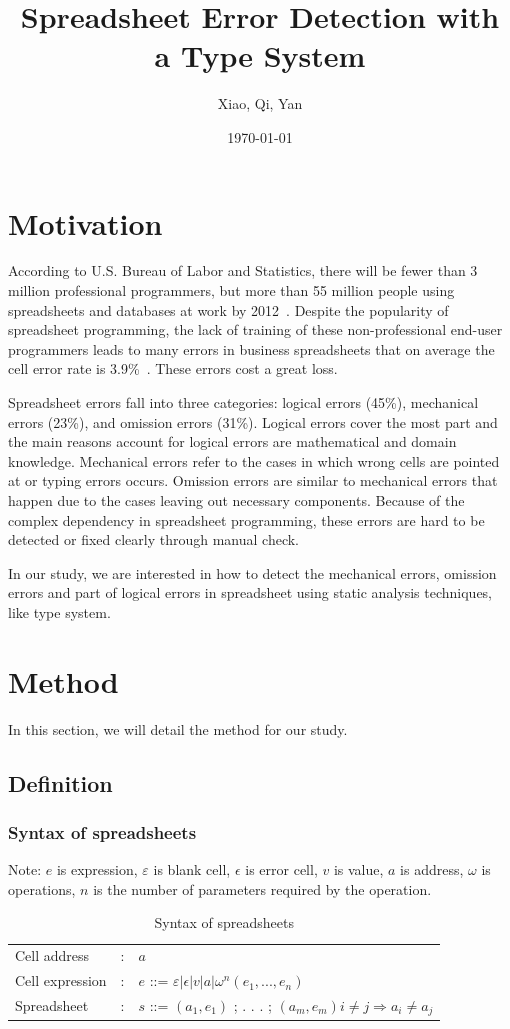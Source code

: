 \documentclass[a4paper]{article}
\title{Spreadsheet Error Detection with a Type System}
\author{Xiao, Qi, Yan}
\date{\today}
\begin{document}
\maketitle


\section{Motivation}
According to U.S. Bureau of Labor and Statistics, there will be fewer than 3 million professional programmers, but more than 55 million people using spreadsheets and databases at work by 2012~\cite{scaffidi2005}. Despite the popularity of spreadsheet programming, the lack of training of these non-professional end-user programmers leads to many errors in business spreadsheets that on average the cell error rate is 3.9\%~\cite{panko2016we}. These errors cost a great loss.

Spreadsheet errors fall into three categories: logical errors (45\%), mechanical errors (23\%), and omission errors (31\%). Logical errors cover the most part and the main reasons account for logical errors are mathematical and domain knowledge. Mechanical errors refer to the cases in which wrong cells are pointed at or typing errors occurs. Omission errors are similar to mechanical errors that happen due to the cases leaving out necessary components. Because of the complex dependency in spreadsheet programming, these errors are hard to be detected or fixed clearly through manual check.

In our study, we are interested in how to detect the mechanical errors, omission errors and part of logical errors in spreadsheet using static analysis techniques, like type system. 

\section{Method}
In this section, we will detail the method for our study.
\subsection{Definition}
\subsubsection{Syntax of spreadsheets}
Note: $e$ is expression, $\varepsilon$ is blank cell, $\epsilon$ is error cell, $v$ is value, $a$ is address, $\omega$ is operations, $n$ is the number of parameters required by the operation.
\begin{table}[h]
\centering
\caption{Syntax of spreadsheets}
\begin{tabular}{lll}
\hline
Cell address& : & $a$\\
Cell expression& : & $e$ ::= $\varepsilon | \epsilon | v | a | \omega^{n}(e_1, . . . , e_n)$\\
Spreadsheet&:& $s$ ::= $(a_1, e_1)$ ; . . . ; $(a_m, e_m) i \neq j \Rightarrow a_i \neq a_j$\\
\hline
  \end{tabular}
\label{syntax}
\end{table}
\end{document}
